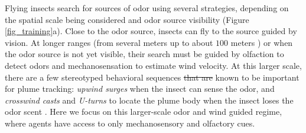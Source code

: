 \documentclass[5p,twocolumn,authoryear]{elsarticle}
\providecommand{\DIFaddtex}[1]{{\protect\color{blue}\uwave{#1}}} %
\providecommand{\DIFdeltex}[1]{{\protect\color{red}\sout{#1}}}                      %
\providecommand{\DIFaddbegin}{} %
\providecommand{\DIFaddend}{} %
\providecommand{\DIFdelbegin}{} %
\providecommand{\DIFdelend}{} %
\providecommand{\DIFadd}[1]{\texorpdfstring{\DIFaddtex{#1}}{#1}} %
\providecommand{\DIFdel}[1]{\texorpdfstring{\DIFdeltex{#1}}{}} %
\newcommand{\DIFscaledelfig}{0.5}
\newlength{\DIFdelgraphicswidth} %
\newlength{\DIFdelgraphicsheight} %
\newcommand{\DIFaddincludegraphics}[2][]{{\color{blue}\fbox{\DIFOincludegraphics[#1]{#2}}}} %
\newcommand{\DIFdelincludegraphics}[2][]{%
\sbox{\DIFdelgraphicsbox}{\DIFOincludegraphics[#1]{#2}}%
\settoboxwidth{\DIFdelgraphicswidth}{\DIFdelgraphicsbox} %
\settoboxtotalheight{\DIFdelgraphicsheight}{\DIFdelgraphicsbox} %
\scalebox{\DIFscaledelfig}{%
\parbox[b]{\DIFdelgraphicswidth}{\usebox{\DIFdelgraphicsbox}\\[-\baselineskip] \rule{\DIFdelgraphicswidth}{0em}}\llap{\resizebox{\DIFdelgraphicswidth}{\DIFdelgraphicsheight}{%
\setlength{\unitlength}{\DIFdelgraphicswidth}%
\begin{picture}(1,1)%
\thicklines\linethickness{2pt} %
{\color[rgb]{1,0,0}\put(0,0){\framebox(1,1){}}}%
{\color[rgb]{1,0,0}\put(0,0){\line( 1,1){1}}}%
{\color[rgb]{1,0,0}\put(0,1){\line(1,-1){1}}}%
\end{picture}%
}\hspace*{3pt}}} %
} %
\DeclareRobustCommand{\DIFaddbegin}{\DIFOaddbegin \let\includegraphics\DIFaddincludegraphics} %
\DeclareRobustCommand{\DIFaddend}{\DIFOaddend \let\includegraphics\DIFOincludegraphics} %
\DeclareRobustCommand{\DIFdelbegin}{\DIFOdelbegin \let\includegraphics\DIFdelincludegraphics} %
\DeclareRobustCommand{\DIFdelend}{\DIFOaddend \let\includegraphics\DIFOincludegraphics} %
\begin{document}
\DIFdelend Flying insects search for sources of odor using several strategies, depending on the spatial scale being considered and odor source visibility \citep{baker2018algorithms} (Figure \ref{fig_training}a). 
Close to the odor source, insects can fly to the source guided by vision.
At longer ranges (from several meters up to about $100$ meters \citep{wall1987range}) or when the odor source is not yet visible, their search must be guided by olfaction to detect odors and mechanosensation to estimate wind velocity.
At this larger scale, there are a few stereotyped behavioral sequences \DIFdelbegin \DIFdel{that are }\DIFdelend known to be important for plume tracking: 
\textit{upwind surges} when the insect can sense the odor, and 
\textit{crosswind casts} and \textit{U-turns} to locate the plume body when the insect loses the odor scent \DIFaddbegin \DIFadd{(Figure~\ref{fig_training}a) }\DIFaddend \citep{carde2008navigational}.
Here we focus on this larger-scale odor and wind guided regime, where agents have access to only mechanosensory and olfactory cues.
\end{document}
